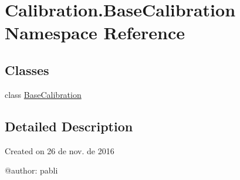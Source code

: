 \hypertarget{namespace_calibration_1_1_base_calibration}{}\section{Calibration.\+Base\+Calibration Namespace Reference}
\label{namespace_calibration_1_1_base_calibration}
\subsection*{Classes}
\begin{DoxyCompactItemize}
\item 
class \hyperlink{class_calibration_1_1_base_calibration_1_1_base_calibration}{Base\+Calibration}
\end{DoxyCompactItemize}


\subsection{Detailed Description}
\begin{DoxyVerb}Created on 26 de nov. de 2016

@author: pabli
\end{DoxyVerb}
 